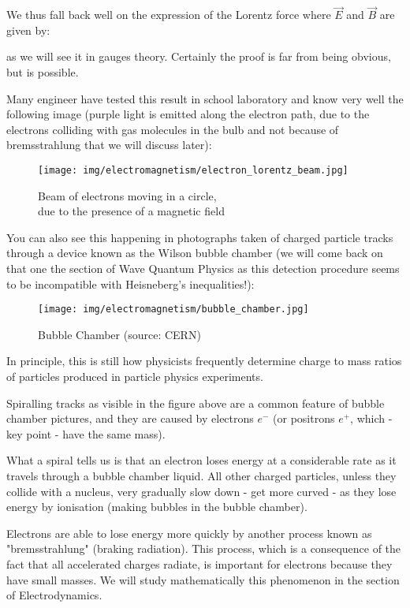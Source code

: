 	We thus fall back well on the expression of the Lorentz force where $\vec{E}$ and $\vec{B}$ are given by:
	
	as we will see it in gauges theory. Certainly the proof is far from being obvious, but is possible.
	
	Many engineer have tested this result in school laboratory and know very well the following image (purple light is emitted along the electron path, due to the electrons colliding with gas molecules in the bulb and not because of bremsstrahlung that we will discuss later):
	\begin{figure}[H]
		\centering
		\texttt{[image: img/electromagnetism/electron\_lorentz\_beam.jpg]}
		\caption{Beam of electrons moving in a circle,\\ due to the presence of a magnetic field}
	\end{figure}
	You can also see this happening in photographs taken of charged particle tracks through a device known as the Wilson bubble chamber (we will come back on that one the section of Wave Quantum Physics as this detection procedure seems to be incompatible with Heisneberg's inequalities!): 
	
	\begin{figure}[H]
		\centering
		\texttt{[image: img/electromagnetism/bubble\_chamber.jpg]}
		\caption[Bubble Chamber]{Bubble Chamber (source: CERN)}
	\end{figure}
	In principle, this is still how physicists frequently determine charge to mass ratios of particles produced in particle physics experiments.
	
	Spiralling tracks as visible in the figure above are a common feature of bubble chamber pictures, and they are caused by electrons $e^{-}$ (or positrons  $e^{+}$, which - key point - have the same mass).

	What a spiral tells us is that an electron loses energy at a considerable rate as it travels through a bubble chamber liquid. All other charged particles, unless they collide with a nucleus, very gradually slow down - get more curved - as they lose energy by ionisation (making bubbles in the bubble
chamber).

	Electrons are able to lose energy more quickly by another process known as "bremsstrahlung" (braking radiation). This process, which is a consequence of the fact that all accelerated charges radiate, is important for electrons because they have small masses. We will study mathematically this phenomenon in the section of Electrodynamics.
	
